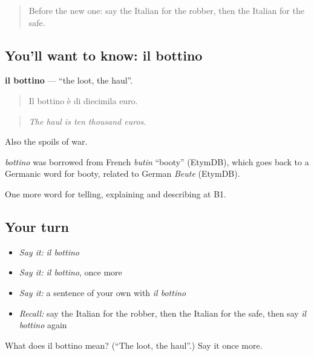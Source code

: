 \label{lesson:IT-C292-bottino}



\begin{quote}
Before the new one: say the Italian for the robber, then the Italian for the safe.
\end{quote}

\subsection*{You'll want to know: il bottino}
\textbf{il bottino} — \textquotedblleft{}the loot, the haul\textquotedblright{}.

\begin{quote}
Il bottino è di diecimila euro.
\end{quote}

\begin{quote}
\emph{The haul is ten thousand euros.}
\end{quote}

Also the spoils of war.

\begin{cousinweb}
\emph{bottino} was borrowed from French \emph{butin} \textquotedblleft{}booty\textquotedblright{} (EtymDB), which goes back to a Germanic word for booty, related to German \emph{Beute} (EtymDB).
\end{cousinweb}

\begin{grammarlens}[title={What you've built}]
One more word for telling, explaining and describing at B1.
\end{grammarlens}

\subsection*{Your turn}
\begin{itemize}
\raggedright
  \item \emph{Say it:} \emph{il bottino}
  \item \emph{Say it:} \emph{il bottino}, once more
  \item \emph{Say it:} a sentence of your own with \emph{il bottino}
  \item \emph{Recall:} say the Italian for the robber, then the Italian for the safe, then say \emph{il bottino} again
\end{itemize}

\begin{tcolorbox}[breakable,colback=teal!4,colframe=teal!35!black,title={Before you move on}]
What does il bottino mean? (\textquotedblleft{}The loot, the haul\textquotedblright{}.) Say it once more.
\end{tcolorbox}
